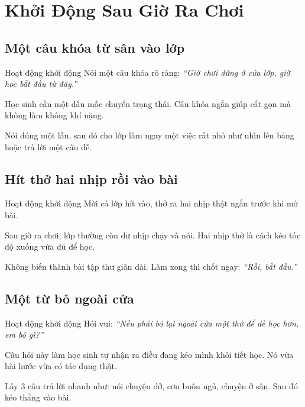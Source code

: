 \chapter{Khởi Động Sau Giờ Ra Chơi}

\section{Một câu khóa từ sân vào lớp}
\begin{khoidongbox}{Hoạt động khởi động}
Nói một câu khóa rõ ràng: \textit{``Giờ chơi dừng ở cửa lớp, giờ học bắt đầu từ đây.''}
\end{khoidongbox}
\begin{visaohieuqua}
Học sinh cần một dấu mốc chuyển trạng thái. Câu khóa ngắn giúp cắt gọn mà không làm không khí nặng.
\end{visaohieuqua}
\begin{cachlam5phut}
Nói đúng một lần, sau đó cho lớp làm ngay một việc rất nhỏ như nhìn lên bảng hoặc trả lời một câu dễ.
\end{cachlam5phut}
\ngancach

\section{Hít thở hai nhịp rồi vào bài}
\begin{khoidongbox}{Hoạt động khởi động}
Mời cả lớp hít vào, thở ra hai nhịp thật ngắn trước khi mở bài.
\end{khoidongbox}
\begin{visaohieuqua}
Sau giờ ra chơi, lớp thường còn dư nhịp chạy và nói. Hai nhịp thở là cách kéo tốc độ xuống vừa đủ để học.
\end{visaohieuqua}
\begin{cachlam5phut}
Không biến thành bài tập thư giãn dài. Làm xong thì chốt ngay: \textit{``Rồi, bắt đầu.''}
\end{cachlam5phut}
\ngancach

\section{Một từ bỏ ngoài cửa}
\begin{khoidongbox}{Hoạt động khởi động}
Hỏi vui: \textit{``Nếu phải bỏ lại ngoài cửa một thứ để dễ học hơn, em bỏ gì?''}
\end{khoidongbox}
\begin{visaohieuqua}
Câu hỏi này làm học sinh tự nhận ra điều đang kéo mình khỏi tiết học. Nó vừa hài hước vừa có tác dụng thật.
\end{visaohieuqua}
\begin{cachlam5phut}
Lấy 3 câu trả lời nhanh như: nói chuyện dở, cơn buồn ngủ, chuyện ở sân. Sau đó kéo thẳng vào bài.
\end{cachlam5phut}
\ngancach

